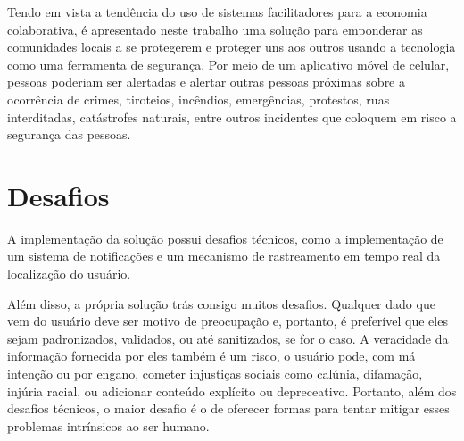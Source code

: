 Tendo em vista a tendência do uso de sistemas facilitadores para a economia colaborativa, é apresentado neste trabalho uma solução para emponderar as comunidades locais a se protegerem e proteger uns aos outros usando a tecnologia como uma ferramenta de segurança. Por meio de um aplicativo móvel de celular, pessoas poderiam ser alertadas e alertar outras pessoas próximas sobre a ocorrência de crimes, tiroteios, incêndios, emergências, protestos, ruas interditadas, catástrofes naturais, entre outros incidentes que coloquem em risco a segurança das pessoas.

\section{Desafios}

A implementação da solução possui desafios técnicos, como a implementação de um sistema de notificações e um mecanismo de rastreamento em tempo real da localização do usuário.

Além disso, a própria solução trás consigo muitos desafios. Qualquer dado que vem do usuário deve ser motivo de preocupação e, portanto, é preferível que eles sejam padronizados, validados, ou até sanitizados, se for o caso. A veracidade da informação fornecida por eles também é um risco, o usuário pode, com má intenção ou por engano, cometer injustiças sociais como calúnia, difamação, injúria racial, ou adicionar conteúdo explícito ou depreceativo. Portanto, além dos desafios técnicos, o maior desafio é o de oferecer formas para tentar mitigar esses problemas intrínsicos ao ser humano.


